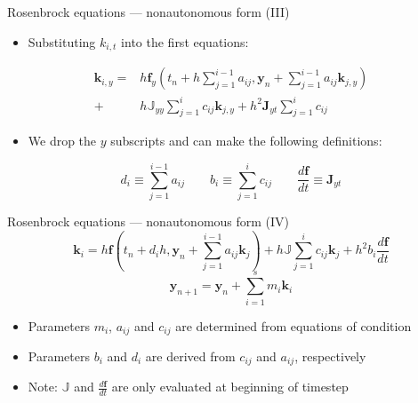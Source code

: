 \documentclass[serif]{beamer}
\begin{document}
\begin{frame}{Rosenbrock equations --- nonautonomous form (III)}
  \label{slide:nonautonomous}
  \begin{itemize}
  \item<1-> Substituting $k_{i,t}$ into the first equations:
  \end{itemize}
  \begin{align*}
    \mathbf{k}_{i,y} = &  h\mathbf{f}_y \left(t_n + h\sum_{j=1}^{i-1}a_{ij},\mathbf{y}_n + \sum_{j=1}^{i-1}a_{ij}\mathbf{k}_{j,y}\right) \\
                                + & h\mathbb{J}_{yy}\sum_{j=1}^i c_{ij}\mathbf{k}_{j,y}  + h^2\mathbf{J}_{yt}\sum_{j=1}^i c_{ij}
  \end{align*}
  \begin{itemize}
  \item We drop the $y$ subscripts and can make the following definitions: 
  \end{itemize}
  \begin{equation}
    \nonumber d_i \equiv \sum_{j=1}^{i-1} a_{ij} \qquad  b_i \equiv \sum_{j=1}^i c_{ij} \qquad \frac{d\mathbf{f}}{dt} \equiv \mathbf{J}_{yt}
  \end{equation}
\end{frame}

\begin{frame}{Rosenbrock equations --- nonautonomous form (IV)}
  \begin{equation}
    \nonumber \mathbf{k}_{i} = h\mathbf{f} \left(t_n + d_ih,\mathbf{y}_n + \sum_{j=1}^{i-1}a_{ij}\mathbf{k}_{j}\right) 
                                + h\mathbb{J}\sum_{j=1}^i c_{ij}\mathbf{k}_{j}  + h^2b_i\frac{d\mathbf{f}}{dt}
  \end{equation}
  \begin{equation}
    \nonumber \mathbf{y}_{n+1} = \mathbf{y}_{n} + \sum_{i=1}^s m_i\mathbf{k}_i
  \end{equation}
  \vfill
  \begin{itemize}
  \item<1-> Parameters $m_i$, $a_{ij}$ and $c_{ij}$ are determined from equations of condition
  \item<1-> Parameters $b_i$ and $d_i$ are derived from $c_{ij}$ and $a_{ij}$, respectively
  \item<1-> \alert{Note:} $\mathbb{J}$ and $\frac{d\mathbf{f}}{dt}$ are only evaluated at beginning of timestep
  \end{itemize}
\end{frame}
\end{document}
